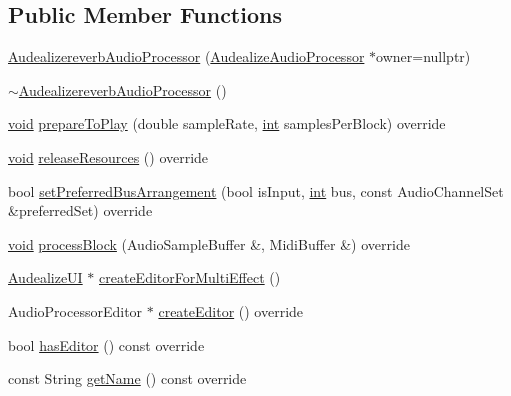 \subsection*{Public Member Functions}
\begin{DoxyCompactItemize}
\item 
\hyperlink{class_audealize_1_1_audealizereverb_audio_processor_ab13b216b97097d2cc33c4bccc4a02bcd}{Audealizereverb\+Audio\+Processor} (\hyperlink{class_audealize_1_1_audealize_audio_processor}{Audealize\+Audio\+Processor} $\ast$owner=nullptr)
\item 
\hyperlink{class_audealize_1_1_audealizereverb_audio_processor_a072bd395dad1b0ad6f027dce4b38ef84}{$\sim$\+Audealizereverb\+Audio\+Processor} ()
\item 
\hyperlink{tk_8h_aba408b7cd755a96426e004c015f5de8e}{void} \hyperlink{class_audealize_1_1_audealizereverb_audio_processor_a9487b00227e636a6fd543dbebb794f35}{prepare\+To\+Play} (double sample\+Rate, \hyperlink{tk_8h_a83f82f76e7fed06f4c49d2db94028a6d}{int} samples\+Per\+Block) override
\item 
\hyperlink{tk_8h_aba408b7cd755a96426e004c015f5de8e}{void} \hyperlink{class_audealize_1_1_audealizereverb_audio_processor_a43ca36f8e13479007f433b477b59b974}{release\+Resources} () override
\item 
bool \hyperlink{class_audealize_1_1_audealizereverb_audio_processor_a2c4ac43c34d351508db48853de9c9049}{set\+Preferred\+Bus\+Arrangement} (bool is\+Input, \hyperlink{tk_8h_a83f82f76e7fed06f4c49d2db94028a6d}{int} bus, const Audio\+Channel\+Set \&preferred\+Set) override
\item 
\hyperlink{tk_8h_aba408b7cd755a96426e004c015f5de8e}{void} \hyperlink{class_audealize_1_1_audealizereverb_audio_processor_a9af25624b77d56ded58de45556332390}{process\+Block} (Audio\+Sample\+Buffer \&, Midi\+Buffer \&) override
\item 
\hyperlink{class_audealize_1_1_audealize_u_i}{Audealize\+UI} $\ast$ \hyperlink{class_audealize_1_1_audealizereverb_audio_processor_aa784ca4a70eb061b53091a76feff6b68}{create\+Editor\+For\+Multi\+Effect} ()
\item 
Audio\+Processor\+Editor $\ast$ \hyperlink{class_audealize_1_1_audealizereverb_audio_processor_a84ceaa6c3bf26df9f6cd92550b823613}{create\+Editor} () override
\item 
bool \hyperlink{class_audealize_1_1_audealizereverb_audio_processor_ada6fb4aa0fa2889e3f2efb43c0599f32}{has\+Editor} () const  override
\item 
const String \hyperlink{class_audealize_1_1_audealizereverb_audio_processor_ab5ba301ae52e6114644445dba35d1a37}{get\+Name} () const  override

\end{DoxyCompactItemize}
